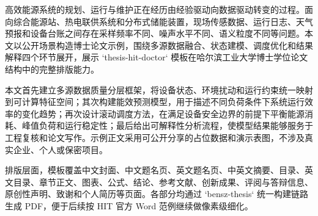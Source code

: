 
高效能源系统的规划、运行与维护正在经历由经验驱动向数据驱动转变的过程。面向综合能源站、热电联供系统和分布式储能装置，现场传感数据、运行日志、天气预报和设备台账之间存在采样频率不同、噪声水平不同、语义粒度不同等问题。本文以公开场景构造博士论文示例，围绕多源数据融合、状态建模、调度优化和结果解释四个环节展开，展示 `thesis-hit-doctor` 模板在哈尔滨工业大学博士学位论文结构中的完整排版能力。

本文首先建立多源数据质量分层框架，将设备状态、环境扰动和运行约束统一映射到可计算特征空间；其次构建能效预测模型，用于描述不同负荷条件下系统运行效率的变化趋势；再次设计滚动调度方法，在满足设备安全边界的前提下平衡能源消耗、峰值负荷和运行稳定性；最后给出可解释性分析流程，使模型结果能够服务于工程复核和论文写作。示例正文采用可公开分享的占位数据和演示表图，不涉及真实企业、个人或保密项目。

排版层面，模板覆盖中文封面、中文题名页、英文题名页、中英文摘要、目录、英文目录、章节正文、图表、公式、结论、参考文献、创新成果、评阅与答辩信息、原创性声明、致谢和个人简历等页面。各部分均通过 `bensz-thesis` 统一构建链路生成 PDF，便于后续按 HIT 官方 Word 范例继续做像素级细化。

\hitKeywordsZhLine
